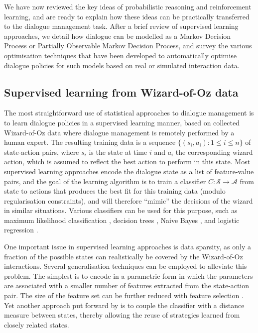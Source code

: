 We have now reviewed the key ideas of probabilistic reasoning and reinforcement learning, and are ready to explain how these ideas can be practically transferred to the dialogue management task.  After a brief review of supervised learning approaches, we detail how dialogue can be modelled as a Markov Decision Process or Partially Observable Markov Decision Process, and survey the various optimisation techniques that have been developed to automatically optimise dialogue policies for such models based on real or simulated interaction data.  

\subsection{Supervised learning from Wizard-of-Oz data}

The most straightforward use of statistical approaches to dialogue management is to learn dialogue policies in a supervised learning manner, based on collected  Wizard-of-Oz data where dialogue management is remotely performed by a human expert.  The resulting training data is a sequence $\{( s_i, a_i ) : 1 \leq i \leq n\}$ of state-action pairs, where $s_i$ is the state at time $i$ and $a_i$ the corresponding wizard action, which is assumed to reflect the best action to perform in this state.  Most supervised learning approaches encode the dialogue state as a list of feature-value pairs, and the goal of the learning algorithm is to train a classifier $C: \mathcal{S} \rightarrow \mathcal{A}$  from state to actions that produces the best fit for this training data (modulo regularisation constraints), and will therefore ``mimic'' the decisions of the wizard in similar situations. Various classifiers can be used for this purpose, such as maximum likelihood classification \citep{Hurtado:2005}, decision trees \citep{LaneKU04}, Naive Bayes \citep{williams2003}, and logistic regression \citep{rieser2006,Passonneau2012}.  

One important issue in supervised learning approaches is data sparsity, as only a fraction of the possible states can realistically be covered by the Wizard-of-Oz interactions.  Several generalisation techniques can be employed to alleviate this problem.  The simplest is to encode in a parametric form in which the parameters are associated with a smaller number of features extracted from the state-action pair. The size of the feature set can be further reduced with feature selection \citep{Passonneau2012}. Yet another approach put forward by \cite{Hurtado:2005} is to couple the classifier with a distance measure between states, thereby allowing the reuse of strategies learned from closely related states.

